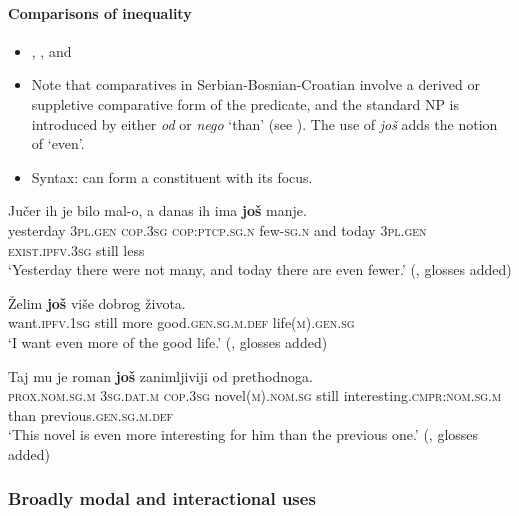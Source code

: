\paragraph{Comparisons of inequality}\label{appendixBCMSComparisons}
\begin{itemize}
	\item \textcite[180]{Alexander2006}, \textcite{Buchholz1991}, \textcite{Prajnkovic2018} and \textcite[s.v. \textit{još}]{HJP}
	\item Note that comparatives in Serbian-Bosnian-Croatian involve a derived or suppletive comparative form of the predicate, and the standard NP is introduced by either \textit{od} or \textit{nego} \lq than' (see \cite[173–180]{Alexander2006}). The use of \textit{još} adds the notion of \lq even\rq{}.
	\item Syntax: can form a constituent with its focus.
\end{itemize}
\begin{exe}
	\ex
	\gll Jučer ih je bilo mal-o, a danas ih ima \textbf{još} manje.\\
	yesterday 3\textsc{pl}.\textsc{gen} \textsc{cop}.3\textsc{sg} \textsc{cop}:\textsc{ptcp}.\textsc{sg}.\textsc{n} few-\textsc{sg}.\textsc{n} and today 3\textsc{pl}.\textsc{gen} \textsc{exist}.\textsc{ipfv}.3\textsc{sg} still less\\
	\glt \lq Yesterday there were not many, and today there are even fewer.' (\cite[181]{Alexander2006}, glosses added)

	\ex
	\gll Želim \textbf{još} više dobrog života.\\
	want.\textsc{ipfv}.1\textsc{sg} still more good.\textsc{gen}.\textsc{sg}.\textsc{m}.\textsc{def} life(\textsc{m}).\textsc{gen}.\textsc{sg}\\
	\glt \lq I want even more of the good life.' (\cite[56]{Alexander2006}, glosses added)

\ex \gll Taj mu je roman \textbf{još} zanimljiviji od prethodnoga.\\
\textsc{prox}.\textsc{nom}.\textsc{sg}.\textsc{m} 3\textsc{sg}.\textsc{dat}.\textsc{m} \textsc{cop}.3\textsc{sg} novel(\textsc{m}).\textsc{nom}.\textsc{sg} still interesting.\textsc{cmpr}:\textsc{nom}.\textsc{sg}.\textsc{m} than previous.\textsc{gen}.\textsc{sg}.\textsc{m}.\textsc{def}\\
\glt \lq This novel is even more interesting for him than the previous one.' (\cite[72]{Prajnkovic2018}, glosses added)
\end{exe}

\subsubsection{Broadly modal and interactional uses}\largerpage
